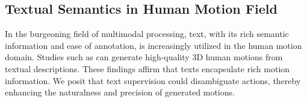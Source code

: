 \documentclass[letterpaper]{article} %
\begin{document}
\subsection{Textual Semantics in Human Motion Field}
In the burgeoning field of multimodal processing, text, with its rich semantic information and ease of annotation, is increasingly utilized in the human motion domain. Studies such as \cite{guo2022generating,zhang2022motiondiffuse,tevet2022motionclip} can generate high-quality 3D human motions from textual descriptions.
These findings affirm that texts encapsulate rich motion information. We posit that text supervision could disambiguate actions, thereby enhancing the naturalness and precision of generated motions.

\end{document}
